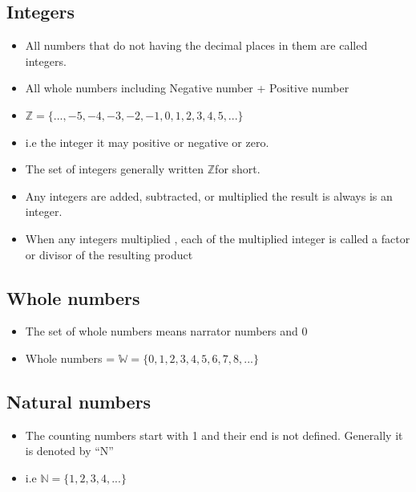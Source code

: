 \documentclass[]{book}
\providecommand{\tightlist}{%
  \setlength{\itemsep}{0pt}\setlength{\parskip}{0pt}}
\begin{document}
\hypertarget{integers}{%
\subsection{Integers}\label{integers}}

\begin{itemize}
\tightlist
\item
  All numbers that do not having the decimal places in them are called integers.
\item
  All whole numbers including Negative number + Positive number
\item
  \(\mathbb{Z} = \{...,-5,-4,-3,-2,-1,0,1,2,3,4,5,...\}\)
\item
  i.e the integer it may positive or negative or zero.
\item
  The set of integers generally written \(\mathbb{Z}\)for short.
\item
  Any integers are added, subtracted, or multiplied the result is always is an integer.
\item
  When any integers multiplied , each of the multiplied integer is called a factor or divisor of the resulting product
\end{itemize}

\hypertarget{whole-numbers}{%
\subsection{Whole numbers}\label{whole-numbers}}

\begin{itemize}
\tightlist
\item
  The set of whole numbers means narrator numbers and \(0\)
\item
  Whole numbers = \(\mathbb{W} = \{ 0,1,2,3,4,5,6,7,8,...\}\)
\end{itemize}

\hypertarget{natural-numbers}{%
\subsection{Natural numbers}\label{natural-numbers}}

\begin{itemize}
\tightlist
\item
  The counting numbers start with 1 and their end is not defined. Generally it is denoted by ``N''
\item
  i.e \(\mathbb{N} =\{1,2,3,4,...\}\)
\end{itemize}
\end{document}
